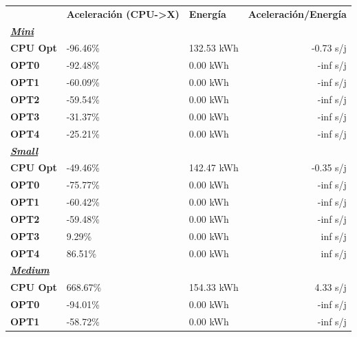 \begin{table}[H]
    \centering
    \begin{tabular}{lllr}
    \rowcolor[HTML]{DAE8FC} \ & \textbf{Aceleración (CPU->X)} & \textbf{	Energía} & \textbf{	Aceleración/Energía} \\
    \cellcolor[HTML]{DAE8FC} \textbf{\textbf{{\emph{{\underline{{Mini}}}}}}} & &	&	 \\
    \rowcolor[HTML]{EFEFEF} \cellcolor[HTML]{DAE8FC} \textbf{CPU Opt} &-96.46\%  &	132.53 kWh  &	-0.73 s/j \\
    \cellcolor[HTML]{DAE8FC} \textbf{OPT0} & -92.48\%  &	0.00 kWh  &	-inf s/j \\
    \rowcolor[HTML]{EFEFEF} \cellcolor[HTML]{DAE8FC} \textbf{OPT1} &-60.09\%  &	0.00 kWh  &	-inf s/j \\
    \cellcolor[HTML]{DAE8FC} \textbf{OPT2} & -59.54\%  &	0.00 kWh  &	-inf s/j \\
    \rowcolor[HTML]{EFEFEF} \cellcolor[HTML]{DAE8FC} \textbf{OPT3} &-31.37\%  &	0.00 kWh  &	-inf s/j \\
    \cellcolor[HTML]{DAE8FC} \textbf{OPT4} & -25.21\%  &	0.00 kWh  &	-inf s/j \\
    \rowcolor[HTML]{EFEFEF} \cellcolor[HTML]{DAE8FC} \textbf{\textbf{{\emph{{\underline{{Small}}}}}}} &&	&	 \\
    \cellcolor[HTML]{DAE8FC} \textbf{CPU Opt} & -49.46\%  &	142.47 kWh  &	-0.35 s/j \\
    \rowcolor[HTML]{EFEFEF} \cellcolor[HTML]{DAE8FC} \textbf{OPT0} &-75.77\%  &	0.00 kWh  &	-inf s/j \\
    \cellcolor[HTML]{DAE8FC} \textbf{OPT1} & -60.42\%  &	0.00 kWh  &	-inf s/j \\
    \rowcolor[HTML]{EFEFEF} \cellcolor[HTML]{DAE8FC} \textbf{OPT2} &-59.48\%  &	0.00 kWh  &	-inf s/j \\
    \cellcolor[HTML]{DAE8FC} \textbf{OPT3} & 9.29\%  &	0.00 kWh  &	inf s/j \\
    \rowcolor[HTML]{EFEFEF} \cellcolor[HTML]{DAE8FC} \textbf{OPT4} &86.51\%  &	0.00 kWh  &	inf s/j \\
    \cellcolor[HTML]{DAE8FC} \textbf{\textbf{{\emph{{\underline{{Medium}}}}}}} & &	&	 \\
    \rowcolor[HTML]{EFEFEF} \cellcolor[HTML]{DAE8FC} \textbf{CPU Opt} &668.67\%  &	154.33 kWh  &	4.33 s/j \\
    \cellcolor[HTML]{DAE8FC} \textbf{OPT0} & -94.01\%  &	0.00 kWh  &	-inf s/j \\
    \rowcolor[HTML]{EFEFEF} \cellcolor[HTML]{DAE8FC} \textbf{OPT1} &-58.72\%  &	0.00 kWh  &	-inf s/j \\

\end{tabular}
\end{table}
